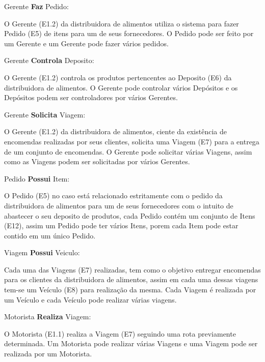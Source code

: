 \documentclass[12pt, onecolumn, titlepage]{article}
\begin{document}
\begin{description}

\item Gerente \textbf{Faz} Pedido: 
\item \qquad O Gerente (E1.2) da distribuidora de alimentos utiliza o sistema para fazer Pedido (E5) de itens para um de seus fornecedores. O Pedido pode ser feito por um Gerente e um Gerente pode fazer vários pedidos.

\item Gerente \textbf{Controla} Deposito: 
\item \qquad O Gerente (E1.2) controla os produtos pertencentes ao Deposito (E6) da distribuidora de alimentos. O Gerente pode controlar vários Depósitos e os Depósitos podem ser controladores por vários Gerentes.

\item Gerente \textbf{Solicita} Viagem: 
\item \qquad O Gerente (E1.2) da distribuidora de alimentos, ciente da existência de encomendas realizadas por seus clientes, solicita uma Viagem (E7) para a entrega de um conjunto de encomendas. O Gerente pode solicitar várias Viagens, assim como as Viagens podem ser solicitadas por vários Gerentes.

\item Pedido \textbf{Possui} Item: 
\item \qquad O Pedido (E5) no caso está relacionado estritamente com o pedido da distribuidora de alimentos para um de seus fornecedores com o intuito de abastecer o seu deposito de produtos, cada Pedido contém um conjunto de Itens (E12), assim um Pedido pode ter vários Itens, porem cada Item pode estar contido em um único Pedido.

\item Viagem \textbf{Possui} Veiculo: 
\item \qquad Cada uma das Viagens (E7) realizadas, tem como o objetivo entregar encomendas para os clientes da distribuidora de alimentos, assim em cada uma dessas viagens tem-se um Veículo (E8) para realização da mesma. Cada Viagem é realizada por um Veículo e cada Veículo pode realizar várias viagens.

\item Motorista \textbf{Realiza} Viagem: 
\item \qquad O Motorista (E1.1) realiza a Viagem (E7) seguindo uma rota previamente determinada. Um Motorista pode realizar várias Viagens e uma Viagem pode ser realizada por um Motorista.


\end{description}
\end{document}
